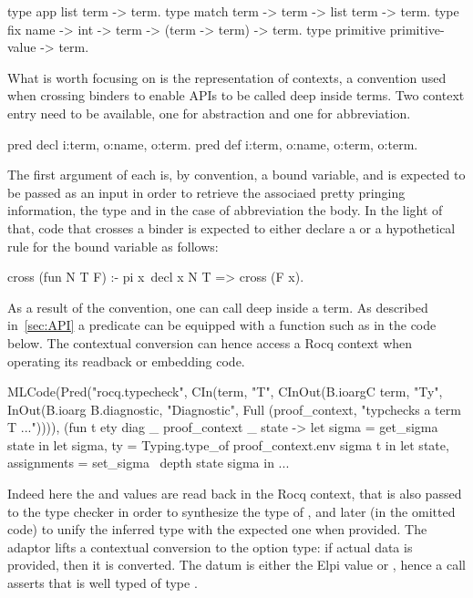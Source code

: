 \documentclass[a4paper, 11pt]{book}
\begin{document}
\begin{elpicode}
type app       list term -> term.                     
type match     term -> term -> list term -> term.   
type fix       name -> int -> term -> (term -> term) -> term.
type primitive primitive-value -> term.
\end{elpicode}

What is worth focusing on is the representation of contexts, a convention
used when crossing binders to enable APIs to be called deep inside terms.
Two context entry need to be available, one for abstraction and one for
abbreviation.

\begin{elpicode}
pred decl i:term, o:name, o:term.                 %
pred def  i:term, o:name, o:term, o:term.         %
\end{elpicode}

The first argument of each is, by convention, a bound variable, and is
expected to be passed as an input in order to retrieve the associaed
pretty pringing information, the type and in the case of
abbreviation the body. In the light of that, code that crosses a binder
is expected to either declare a  or a 
hypothetical rule for the bound variable as follows:

\begin{elpicode}
cross (fun N T F) :- pi x\ decl x N T => cross (F x).
\end{elpicode}

As a result of the convention, one can call 
deep inside a term. As described in~\cref{sec:API} a predicate can
be equipped with a  function such
as  in the code below. The 
contextual conversion can hence access a Rocq context when operating its
readback or embedding code.

\begin{ocamlcode}
MLCode(Pred("rocq.typecheck",
  CIn(term, "T",
  CInOut(B.ioargC term, "Ty",
  InOut(B.ioarg B.diagnostic, "Diagnostic",
  Full (proof_context, "typchecks a term T ...")))),
    (fun t ety diag _ proof_context _ state ->
      let sigma = get_sigma state in
      let sigma, ty = Typing.type_of proof_context.env sigma t in
      let state, assignments = set_sigma ~depth state sigma in
      ...
\end{ocamlcode}

Indeed here the  and  values
are read back in the  Rocq context,
that is also passed to the type checker in order to synthesize the
type of , and later (in the omitted code) to unify
the inferred type with the expected one  when provided.
The  adaptor lifts a contextual conversion to the option
type: if actual data is provided, then it is converted.
The  datum is either the Elpi value
 or , hence a call 
asserts that  is well typed of type .
\end{document}

